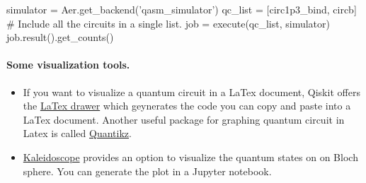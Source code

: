\documentclass[%
oneside,                 %
final,                   %
10pt]{article}
\begin{document}
\bpycod
simulator = Aer.get_backend('qasm_simulator')
qc_list = [circ1p3_bind, circb]       # Include all the circuits in a single list.
job = execute(qc_list, simulator)
job.result().get_counts()

\epycod


\paragraph{Some visualization tools.}
\begin{itemize}
\item If you want to visualize a quantum circuit in a LaTex document, Qiskit offers the \href{{https://www.youtube.com/watch?v=Q_pkenZ05eM}}{LaTex drawer} which geynerates the code you can copy and paste into a LaTex document. Another useful package for graphing quantum circuit in Latex is called \href{{http://mirrors.ibiblio.org/CTAN/graphics/pgf/contrib/quantikz/quantikz.pdf}}{Quantikz}.

\item \href{{https://nonhermitian.org/kaleido/tutorials/interactive/bloch_sphere.html}}{Kaleidoscope} provides an option to visualize the quantum states on on Bloch sphere. You can generate the plot in a Jupyter notebook.
\end{itemize}

\noindent


\end{document}
